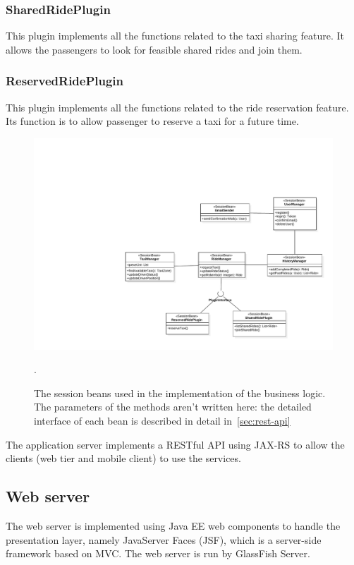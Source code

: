 \subsubsection{SharedRidePlugin}
This plugin implements all the functions related to the taxi sharing feature.
It allows the passengers to look for feasible shared rides and join them.

\subsubsection{ReservedRidePlugin}
This plugin implements all the functions related to the ride reservation feature.
Its function is to allow passenger to reserve a taxi for a future time.


\begin{figure}
    \centering
    \includegraphics[width=\textwidth]{diagrams/class_sessionbeans}
    \caption{The session beans used in the implementation of the business logic. The parameters of the methods aren't written here: the detailed interface of each bean is described in detail in~\autoref{sec:rest-api}}.
    \label{fig:session-beans}
\end{figure}

The application server implements a RESTful API using JAX-RS to allow the clients (web tier and mobile client) to use the services.

\subsection{Web server}
The web server is implemented using Java EE web components to handle the presentation layer, namely JavaServer Faces (JSF), which is a server-side framework based on MVC.
The web server is run by GlassFish Server.


